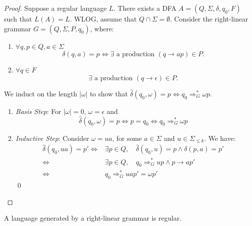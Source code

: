\begin{proof}
  Suppose a regular language $L$. There exists a DFA $A=\left( Q,\Sigma,\delta,q_0,F \right) $ such
  that $L(A)=L$. WLOG, assume that $Q\cap \Sigma=\emptyset$. Consider the
  right-linear grammar $G=\left( Q,\Sigma,P,q_0 \right) $, where:
  \begin{enumerate}
    \item $\forall q,p\in Q,a\in \Sigma$
      \[\delta\left( q,a \right) =p\iff\exists\text{ a production }(q\to ap)\in P.\] 
    \item $\forall q\in F$
      \[\exists \text{ a production }(q\to\epsilon)\in P.\]
  \end{enumerate}
  We induct on the length $\left| \omega \right| $ to show that
  $\hat{\delta}\left( q_0,\omega \right)=p\iff q_0 \Rightarrow _G^{*}\omega p$.
  \begin{enumerate}
    \item \textit{Basis Step}: For $\left| \omega \right| =0$, $\omega=\epsilon$ and 
      \[\hat{\delta}\left( q_0,\omega \right)=p\iff p=q_0\iff q_0 \Rightarrow _G^{*}\omega p\]
    \item \textit{Inductive Step}: Consider $\omega=ua$, for some $a\in \Sigma$
      and $u\in \Sigma_{\le k}$. We have:
      \begin{align*}
        \hat{\delta}\left( q_0,ua \right) =p'\iff&\exists p\in Q,\quad
        \hat{\delta}\left( q_0,u \right) =p\wedge\delta\left( p,a \right) =p'\\
        \iff&\exists p\in Q,\quad q_0 \Rightarrow _G^{*}up\wedge p\to ap'\\
        \iff&q_0 \Rightarrow _G^{*}uap'=\omega p'
      \end{align*}\vspace{-4mm}\qed%
  \end{enumerate}
\end{proof}
\vspace{-4mm}
\begin{theorem}
  A language generated by a right-linear grammar is regular.
\end{theorem}
